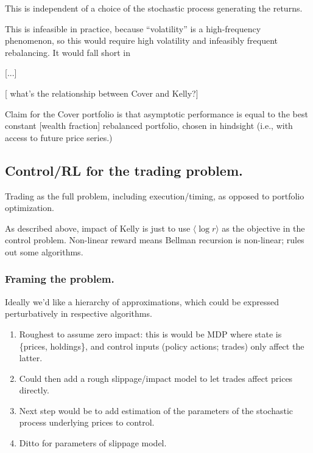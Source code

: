 \documentclass[notitlepage,openany,11pt]{report}
\theoremstyle{plain}%
\numberwithin{equation}{section}
\begin{document}
This is independent of a choice of the stochastic process generating the returns. 

This is infeasible in practice, because ``volatility'' is a high-frequency phenomenon, so this would require high volatility  and infeasibly frequent rebalancing. It would fall short in 

[...]

[ what's the relationship between Cover and Kelly?]

Claim for the Cover portfolio is that asymptotic performance is equal to the best constant [wealth fraction] rebalanced portfolio, chosen in hindsight (i.e., with access to future price series.)



\subsection{Control/RL for the trading problem.} 

Trading as the full problem, including execution/timing, as opposed to portfolio optimization.

As described above, impact of Kelly is just to use $\langle \log r \rangle$ as the objective in the control problem. Non-linear reward means Bellman recursion is non-linear; rules out some algorithms.

\subsubsection{Framing the problem.} 

Ideally we'd like a hierarchy of approximations, which could be expressed perturbatively in respective algorithms.
\begin{enumerate}
\item Roughest to assume zero impact: this is would be MDP where state is \{prices, holdings\}, and control inputs (policy actions; trades) only affect the latter.
\item Could then add a rough slippage/impact model to let trades affect prices directly.
\item Next step would be to add estimation of the parameters of the stochastic process underlying prices to control.
\item Ditto for parameters of slippage model.

\end{enumerate}
\end{document}
